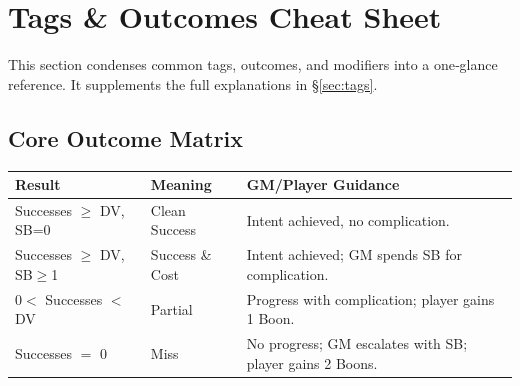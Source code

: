 \section{Tags \& Outcomes Cheat Sheet}
\label{sec:tags-cheatsheet}

This section condenses common tags, outcomes, and modifiers into a one‑glance reference. It supplements the full explanations in \S\ref{sec:tags}.

\subsection{Core Outcome Matrix}
\begin{center}
\begin{longtable}{|p{2.8cm}|p{3.5cm}|p{8.2cm}|}
\hline
\textbf{Result} & \textbf{Meaning} & \textbf{GM/Player Guidance} \\
\hline
Successes $\ge$ DV, SB=0 & Clean Success & Intent achieved, no complication. \\
\hline
Successes $\ge$ DV, SB$\ge$1 & Success \& Cost & Intent achieved; GM spends SB for complication. \\
\hline
$0 <$ Successes $<$ DV & Partial & Progress with complication; player gains 1 Boon. \\
\hline
Successes $=$ 0 & Miss & No progress; GM escalates with SB; player gains 2 Boons. \\
\hline
\end{longtable}
\end{center}

